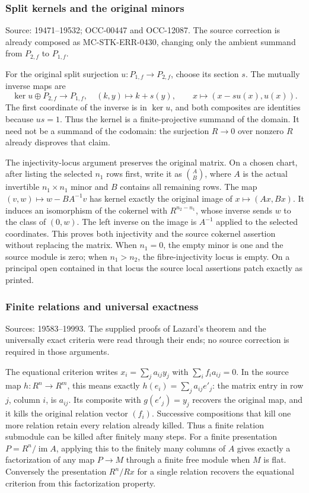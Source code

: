 \subsubsection{Split kernels and the original minors}\label{split-kernels-and-the-original-minors}

Source: 19471--19532; OCC-00447 and OCC-12087. The source correction is already composed as MC-STK-ERR-0430, changing only the ambient summand from \(P_{2,f}\) to \(P_{1,f}\).

For the original split surjection \(u:P_{1,f}\to P_{2,f}\), choose its section \(s\). The mutually inverse maps are \[
\ker u\oplus P_{2,f}\longrightarrow P_{1,f},\quad(k,y)\mapsto k+s(y),
\qquad
x\longmapsto(x-su(x),u(x)).
\] The first coordinate of the inverse is in \(\ker u\), and both composites are identities because \(us=1\). Thus the kernel is a finite-projective summand of the domain. It need not be a summand of the codomain: the surjection \(R\to0\) over nonzero \(R\) already disproves that claim.

The injectivity-locus argument preserves the original matrix. On a chosen chart, after listing the selected \(n_1\) rows first, write it as \(\binom A B\), where \(A\) is the actual invertible \(n_1\times n_1\) minor and \(B\) contains all remaining rows. The map \((v,w)\mapsto w-BA^{-1}v\) has kernel exactly the original image of \(x\mapsto(Ax,Bx)\). It induces an isomorphism of the cokernel with \(R^{n_2-n_1}\), whose inverse sends \(w\) to the class of \((0,w)\). The left inverse on the image is \(A^{-1}\) applied to the selected coordinates. This proves both injectivity and the source cokernel assertion without replacing the matrix. When \(n_1=0\), the empty minor is one and the source module is zero; when \(n_1>n_2\), the fibre-injectivity locus is empty. On a principal open contained in that locus the source local assertions patch exactly as printed.

\subsubsection{Finite relations and universal exactness}\label{finite-relations-and-universal-exactness}

Sources: 19583--19993. The supplied proofs of Lazard's theorem and the universally exact criteria were read through their ends; no source correction is required in those arguments.

The equational criterion writes \(x_i=\sum_j a_{ij}y_j\) with \(\sum_i f_i a_{ij}=0\). In the source map \(h:R^n\to R^m\), this means exactly \(h(e_i)=\sum_j a_{ij}e'_j\): the matrix entry in row \(j\), column \(i\), is \(a_{ij}\). Its composite with \(g(e'_j)=y_j\) recovers the original map, and it kills the original relation vector \((f_i)\). Successive compositions that kill one more relation retain every relation already killed. Thus a finite relation submodule can be killed after finitely many steps. For a finite presentation \(P=R^n/\operatorname{im}A\), applying this to the finitely many columns of \(A\) gives exactly a factorization of any map \(P\to M\) through a finite free module when \(M\) is flat. Conversely the presentation \(R^n/Rx\) for a single relation recovers the equational criterion from this factorization property.

